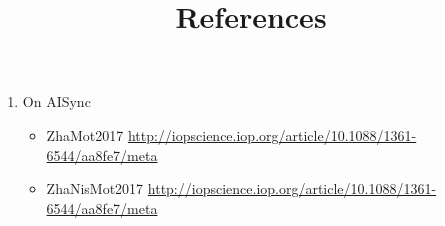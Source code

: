 \documentclass[12pt,a4paper,final]{article}
\title{References}
\begin{document}
\begin{enumerate}
    \item On AISync
    \begin{itemize}
        \item ZhaMot2017 
        \url{http://iopscience.iop.org/article/10.1088/1361-6544/aa8fe7/meta}
        
        \item ZhaNisMot2017 
        \url{http://iopscience.iop.org/article/10.1088/1361-6544/aa8fe7/meta}
    \end{itemize}
\end{enumerate}
\end{document}
